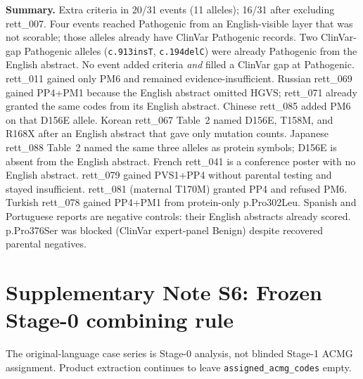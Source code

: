 \documentclass[12pt]{article}
\begin{document}
\textbf{Summary.} Extra criteria in 20/31 events (11 alleles); 16/31 after
excluding rett\_007. Four events reached Pathogenic from an
English-visible layer that was not scorable; those alleles already have
ClinVar Pathogenic records. Two ClinVar-gap Pathogenic alleles
(\texttt{c.913insT}, \texttt{c.194delC}) were already Pathogenic from the
English abstract. No event added criteria \emph{and} filled a ClinVar gap
at Pathogenic. rett\_011 gained only PM6 and remained
evidence-insufficient. Russian rett\_069 gained PP4+PM1 because the
English abstract omitted HGVS; rett\_071 already granted the same codes
from its English abstract. Chinese rett\_085 added PM6 on that D156E
allele. Korean rett\_067 Table~2 named D156E, T158M, and R168X after an
English abstract that gave only mutation counts. Japanese rett\_088
Table~2 named the same three alleles as protein symbols; D156E is absent
from the English abstract. French rett\_041 is a
conference poster with no English abstract. rett\_079 gained PVS1+PP4
without parental testing and stayed insufficient. rett\_081 (maternal
T170M) granted PP4 and refused PM6. Turkish rett\_078 gained PP4+PM1 from
protein-only p.Pro302Leu. Spanish and Portuguese reports are negative
controls: their English abstracts already scored. p.Pro376Ser was blocked
(ClinVar expert-panel Benign) despite recovered parental negatives.

\clearpage

\section*{Supplementary Note S6: Frozen Stage-0 combining rule}

The original-language case series is Stage-0 analysis, not blinded
Stage-1 ACMG assignment. Product extraction continues to leave
\texttt{assigned\_acmg\_codes} empty.
\end{document}
